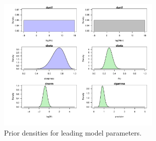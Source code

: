 \begin{frame}[t,allowframebreaks]
	\begin{figure}[htbp]
		\centering
		\includegraphics[width=0.7\textwidth]{../FIGS/qPriorFigs/iscam_fig_theta_prior_density.pdf}
		\caption{Prior densities for leading model parameters.}
		\label{fig:priors}
	\end{figure}
\end{frame}





















